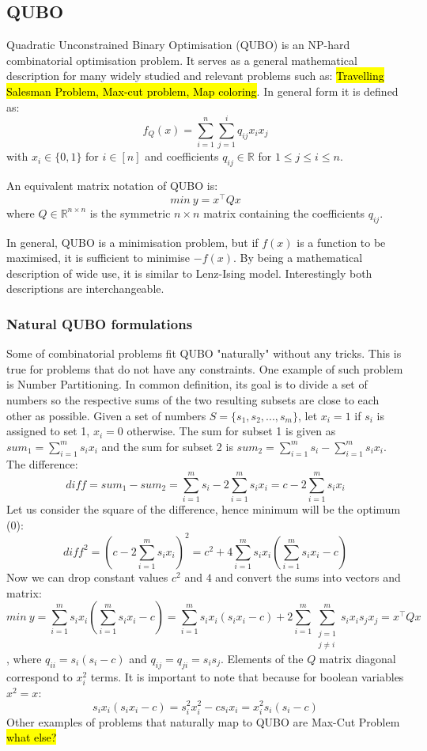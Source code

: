 \subsection{QUBO}
Quadratic Unconstrained Binary Optimisation (QUBO) is an NP-hard combinatorial optimisation problem. It serves as a general mathematical description for many widely studied and relevant problems such as: \hl{Travelling Salesman Problem, Max-cut problem, Map coloring}.  In general form it is defined as:
\[f_Q(x) = \sum_{i=1}^n \sum_{j=1}^i q_{ij} x_i x_j\]
with $x_i\in\lbrace 0,1\rbrace$ for $i\in[n]$ and coefficients $q_{ij}\in\mathbb{R}$ for $1\leq j\leq i\leq n$.

An equivalent matrix notation of QUBO is:
\[ min\ y=x^\top Qx\]
where $Q\in\mathbb{R}^{n\times n}$ is the symmetric $n\times n$ matrix containing the coefficients $q_{ij}$.

In general, QUBO is a minimisation problem, but if $f(x)$ is a function to be maximised, it is sufficient to minimise $-f(x)$. By being a mathematical description of wide use, it is similar to Lenz-Ising model. Interestingly both descriptions are interchangeable.

\subsubsection{Natural QUBO formulations}\label{subsub:Natural_QUBO}
Some of combinatorial problems fit QUBO "naturally" without any tricks. This is true for problems that do not have any constraints. One example of such problem is Number Partitioning. In common definition, its goal is to divide a set of numbers so the respective sums of the two resulting subsets are close to each other as possible. Given a set of numbers $S=\lbrace s_1,s_2,...,s_m\rbrace$, let $x_i=1$ if $s_i$ is assigned to set 1, $x_i=0$ otherwise. The sum for subset 1 is given as $sum_1=\sum_{i=1}^ms_ix_i$ and the sum for subset 2 is $sum_2=\sum_{i=1}^ms_i - \sum_{i=1}^ms_ix_i$. The difference:
\[diff=sum_1-sum_2=\sum_{i=1}^ms_i - 2\sum_{i=1}^ms_ix_i= c - 2\sum_{i=1}^ms_ix_i\]
Let us consider the square of the difference, hence minimum will be the optimum (0):
\[diff^2=\left(c - 2\sum_{i=1}^ms_ix_i\right)^2=c^2+4\sum_{i=1}^ms_ix_i\left(\sum_{i=1}^ms_ix_i-c\right)\]
Now we can drop constant values $c^2$ and $4$ and convert the sums into vectors and matrix:
\[min\ y =\sum_{i=1}^ms_ix_i\left(\sum_{i=1}^ms_ix_i-c\right)=
\sum_{i=1}^m s_i x_i(s_i x_i-c) + 2\sum_{i=1}^m \sum_{\substack{j=1 \\ j\ne i}}^m s_i x_i s_j x_j=
x^\top Qx\],
where $q_{ii}=s_i(s_i-c)$ and $q_{ij}=q_{ji}=s_is_j$. Elements of the $Q$ matrix diagonal correspond to $x_i^2$ terms. It is important to note that because for boolean variables $x^2=x$:
\[s_i x_i(s_i x_i-c) = s_i^2 x_i^2 - c s_i x_i = x_i^2 s_i(s_i - c)\]
Other examples of problems that naturally map to QUBO are Max-Cut Problem \hl{what else?}
